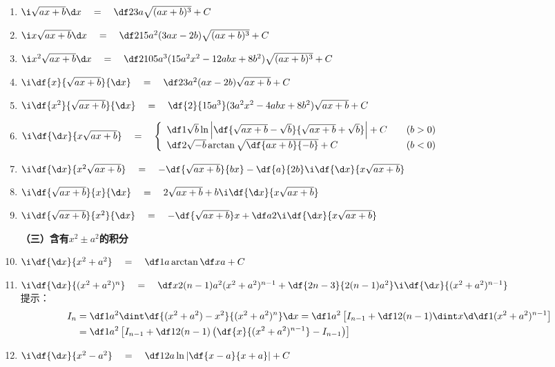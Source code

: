 \begin{enumerate}
\bigskip
{\bf （二）含有$\sqrt{ax+b}$的积分}\ps{$y=\sqrt{ax+b}$}
  \item $\i\sqrt{ax+b} {\d x}\quad=\quad \df 2{3a}\sqrt{(ax+b)^3}+C$
  \item $\i x\sqrt{ax+b}{\d x}  \quad=\quad \df 2{15a^2}(3ax-2b)\sqrt{(ax+b)^3}+C$
  \item $\i x^2\sqrt{ax+b}{\d x}  \quad=\quad \df
  2{105a^3}(15a^2x^2-12abx+8b^2)\sqrt{(ax+b)^3}+C$
  \item $\i\df{x}{\sqrt{ax+b}}{\d x} \quad=\quad \df 2{3a^2}(ax-2b)\sqrt{ax+b}+C$
  \item $\i\df{x^2}{\sqrt{ax+b}}{\d x} \quad=\quad
  \df{2}{15a^3}(3a^2x^2-4abx+8b^2)\sqrt{ax+b}+C$
  \item $\i\df{{\d x}}{x\sqrt{ax+b}} \quad=\quad \left\{\begin{array}{ll}
  \df 1{\sqrt b}\ln\left|\df{\sqrt{ax+b}-\sqrt b}{\sqrt{ax+b}+\sqrt b}\right|+C
  &\quad (b>0)\\
  \df 2{\sqrt{-b}}\arctan\sqrt{\df{ax+b}{-b}}+C&\quad (b<0)
  \end{array}
  \right.$
  \item
  $\i\df{{\d x}}{x^2\sqrt{ax+b}} \quad=\quad -\df{\sqrt{ax+b}}{bx}-\df{a}{2b}\i\df{{\d x}}{x\sqrt{ax+b}}$
  \item $\i\df{\sqrt{ax+b}}{x}{\d x} \quad=\quad 2\sqrt{ax+b}+b\i\df{{\d x}}{x\sqrt{ax+b}}$
  \item $\i\df{\sqrt{ax+b}}{x^2}{\d x} \quad=\quad -\df{\sqrt{ax+b}}x+\df
  a2\i\df{{\d x}}{x\sqrt{ax+b}}$

\bigskip
{\bf （三）含有$x^2\pm a^2$的积分}
  \item $\i\df{{\d x}}{x^2+a^2} \quad=\quad \df 1a\arctan\df xa+C$
  \item $\i\df{{\d x}}{(x^2+a^2)^n} \quad=\quad \df x{2(n-1)a^2(x^2+a^2)^{n-1}}+
  \df{2n-3}{2(n-1)a^2}\i\df{{\d x}}{(x^2+a^2)^{n-1}}$\\
  提示：
  \begin{align}
  I_n&=\df1{a^2}\dint\df{(x^2+a^2)-x^2}{(x^2+a^2)^n}\d x
  =\df1{a^2}\left[I_{n-1}+\df1{2(n-1)}\dint
  x\d\df1{(x^2+a^2)^{n-1}}\right]\notag\\
  &=\df1{a^2}\left[I_{n-1}+\df1{2(n-1)}\left(\df{x}{(x^2+a^2)^{n-1}}
  -I_{n-1}\right)\right]\notag
  \end{align}  
  \item $\i\df{{\d x}}{x^2-a^2} \quad=\quad \df
  1{2a}\ln\left|\df{x-a}{x+a}\right|+C$


\end{enumerate}
